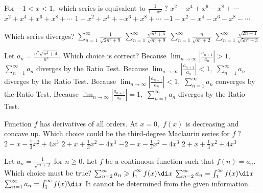 \begin{question}
For \(-1 < x < 1,\) which series is equivalent to \(\frac{1}{1 - x^2} \; ?\)
\choices
{\(x^2 - x^4 + x^6 - x^8 + \cdots\)}
{\(x^2 + x^4 + x^6 + x^8 + \cdots\)}
{}
{\(1 - x^2 + x^4 + -x^6 + x^8 + \cdots\)}
{\(-1 - x^2 - x^4 - x^6 - x^8 - \cdots\)}
\end{question}

\begin{question}
Which series diverges?
\choices
{\(\sum_{n = 1}^\infty \frac{1}{\sqrt{2n^3 + 9}}\)}
{\(\sum_{n = 1}^\infty \frac{\sqrt{n^2 + 5}}{\sqrt{n^6 + 9}}\)}
{}
{\(\sum_{n = 1}^\infty \frac{n}{\sqrt{n^6 + 2}}\)}
{\(\sum_{n = 1}^\infty \frac{\sqrt{2n + 1}}{\sqrt{5n^4 + 3}}\)}
\end{question}

\begin{question}
Let \(a_n = \frac{n^2 \sqrt{n^2 + 4}}{n^3}.\) Which choice is correct?
\choices
{Because \(\lim_{n \to \infty} \left|\frac{a_{n + 1}}{a_n}\right| > 1,\) \(\sum_{n = 1}^\infty a_n\) diverges by the Ratio Test.}
{Because \(\lim_{n \to \infty} \left|\frac{a_{n + 1}}{a_n}\right| < 1,\) \(\sum_{n = 1}^\infty a_n\) diverges by the Ratio Test.}
{Because \(\lim_{n \to \infty} \left|\frac{a_{n + 1}}{a_n}\right| < 1,\) \(\sum_{n = 1}^\infty a_n\) converges by the Ratio Test.}
{Because \(\lim_{n \to \infty} \left|\frac{a_{n + 1}}{a_n}\right| = 1,\) \(\sum_{n = 1}^\infty a_n\) diverges by the Ratio Test.}
{}
\end{question}

\begin{question}
Function \(f\) has derivatives of all orders. At \(x = 0,\) \(f(x)\) is decreasing and concave up. Which choice could be the third-degree Maclaurin series for \(f \; ?\)
\choices
{\(2 + x - \frac{1}{3} x^2 + 4x^3\)}
{\(2 + x + \frac{1}{3} x^2 - 4x^3\)}
{\(-2 - x - \frac{1}{3} x^2 - 4x^3\)}
{}
{\(2 + x + \frac{1}{3} x^2 + 4x^3\)}
\end{question}

\begin{question}
Let \(a_n = \frac{1}{\sqrt{n + 2}}\) for \(n \geq 0.\) Let \(f\) be a continuous function such that \(f(n) = a_n.\) Which choice must be true?
\choices
{}
{\(\sum_{n = 2}^{\infty} a_n \geqslant \int_1^\infty f(x) \di x\)}
{\(\sum_{n = 2}^{\infty} a_n = \int_1^\infty f(x) \di x\)}
{\(\sum_{n = 1}^{\infty} a_n = \int_1^\infty f(x) \di x\)}
{It cannot be determined from the given information.}
\end{question}

